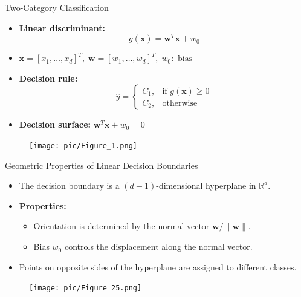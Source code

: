 \documentclass[serif, aspectratio=169]{beamer}
\begin{document}
\begin{frame}{Two-Category Classification}
    \begin{itemize}\itemsep1.2em
        \item \textbf{Linear discriminant:}
        \[
            g(\mathbf{x}) = \mathbf{w}^T\mathbf{x} + w_0
        \]
        \item \(\mathbf{x} = [x_1, \dots, x_d]^T,\; \mathbf{w} = [w_1, \dots, w_d]^T,\; w_0:\text{ bias}\)
        \item \textbf{Decision rule:}
        \[
            \hat{y} =
            \begin{cases}
                C_1, & \text{if } g(\mathbf{x}) \ge 0 \\
                C_2, & \text{otherwise}
            \end{cases}
        \]
        \item \textbf{Decision surface:} $\mathbf{w}^T\mathbf{x} + w_0 = 0$
    \end{itemize}
    \endminipage
    \hfill
        \begin{figure}[bh]
            \texttt{[image: pic/Figure\_1.png]}
        \end{figure}
    \endminipage
\end{frame}


\begin{frame}{Geometric Properties of Linear Decision Boundaries}
    \begin{itemize}\itemsep1.2em
        \item The decision boundary is a $(d-1)$-dimensional hyperplane in $\mathbb{R}^d$.
        \item \textbf{Properties:}
        \begin{itemize}
            \item Orientation is determined by the normal vector $\mathbf{w}/\|\mathbf{w}\|$.
            \item Bias $w_0$ controls the displacement along the normal vector.
        \end{itemize}
        \item Points on opposite sides of the hyperplane are assigned to different classes.
    \end{itemize}
    \begin{figure}
        \texttt{[image: pic/Figure\_25.png]}
    \end{figure}
\end{frame}
\end{document}
